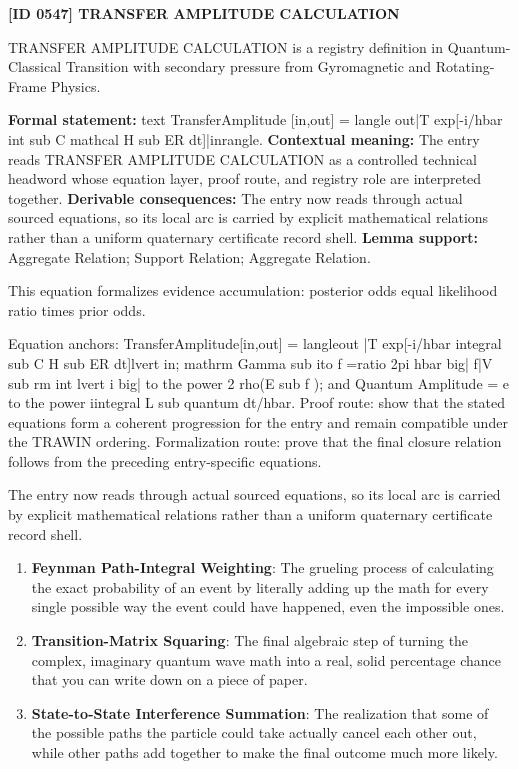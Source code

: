 \clearpage
\noindent\textbf{[ID 0547] TRANSFER AMPLITUDE CALCULATION}\par
\vspace{0.35em}
\begingroup\small
{}
TRANSFER AMPLITUDE CALCULATION is a registry definition in Quantum-Classical Transition with secondary pressure from Gyromagnetic and Rotating-Frame Physics.

\begingroup\footnotesize\setlength{\emergencystretch}{3em}\sloppy
\textbf{Formal statement:} text TransferAmplitude [in,out] = langle out|T exp[-i/hbar int sub C mathcal H sub ER dt]|inrangle. \textbf{Contextual meaning:} The entry reads TRANSFER AMPLITUDE CALCULATION as a controlled technical headword whose equation layer, proof route, and registry role are interpreted together. \textbf{Derivable consequences:} The entry now reads through actual sourced equations, so its local arc is carried by explicit mathematical relations rather than a uniform quaternary certificate record shell. \textbf{Lemma support:} Aggregate Relation; Support Relation; Aggregate Relation.\par
\endgroup

This equation formalizes evidence accumulation: posterior odds equal likelihood ratio times prior odds.

Equation anchors: TransferAmplitude[in,out] = langleout |T exp[-i/hbar integral sub C H sub ER dt]lvert in; mathrm Gamma sub ito f =ratio 2pi hbar big| f|V sub rm int lvert i big| to the power 2 rho(E sub f ); and Quantum Amplitude = e to the power iintegral L sub quantum dt/hbar. Proof route: show that the stated equations form a coherent progression for the entry and remain compatible under the TRAWIN ordering. Formalization route: prove that the final closure relation follows from the preceding entry-specific equations.

The entry now reads through actual sourced equations, so its local arc is carried by explicit mathematical relations rather than a uniform quaternary certificate record shell.
\endgroup

\begin{enumerate}[leftmargin=1.6em,itemsep=6pt,topsep=4pt]
\item \textbf{Feynman Path-Integral Weighting}: The grueling process of calculating the exact probability of an event by literally adding up the math for every single possible way the event could have happened, even the impossible ones.
\item \textbf{Transition-Matrix Squaring}: The final algebraic step of turning the complex, imaginary quantum wave math into a real, solid percentage chance that you can write down on a piece of paper.
\item \textbf{State-to-State Interference Summation}: The realization that some of the possible paths the particle could take actually cancel each other out, while other paths add together to make the final outcome much more likely.
\end{enumerate}

